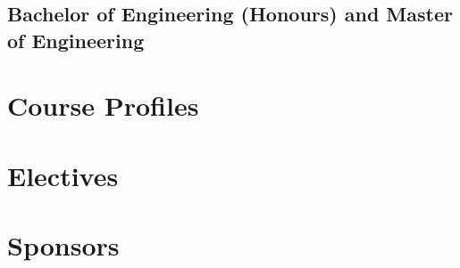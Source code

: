 \documentclass[a4paper,12pt]{report}
\begin{document}
\newpage

\section{Bachelor of Engineering (Honours) and Master of Engineering}


\chapter{Course Profiles}


\chapter{Electives}


\chapter{Sponsors} %
\end{document}
